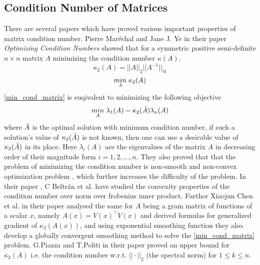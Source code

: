 \subsection{Condition Number of Matrices}
There are several papers which have proved various important properties of matrix condition number. Pierre Maréchal and Jane J. Ye in their paper \textit{Optimizing Condition Numbers}\cite{marechal2009optimizing} showed that for a symmetric positive semi-definite $n\times n$ matrix $A$ minimizing the condition number $\kappa (A)$.
\begin{equation} \label{cond_matrix}
    \kappa_2 (A) = ||A||_2||A^{-1}||_@
\end{equation}
\begin{equation} \label{min_cond_matrix}
    \underset{A}{min}\hspace{1mm} \kappa_2 (A)
\end{equation}
\ref{min_cond_matrix} is euqivalent to minimizing the following objective
\begin{equation}
    \underset{A}{min}\hspace{1mm} \lambda_1(A) - \kappa_2 (\Bar{A}) \lambda_n(A)
\end{equation}
where $\Bar{A}$ is the optimal solution with minimum condition number, if such a solution's value of $\kappa_2 (\Bar{A})$ is not known, then one can use a desirable value of $\kappa_2 (\Bar{A})$ in its place. Here $\lambda_i(A)$ are the eigenvalues of the matrix $A$ in decreasing order of their magnitude form $i=1,2,...,n$. They also proved that that the problem of minimizing the condition number is non-smooth and non-convex optimization problem \cite{marechal2009optimizing}, which further increases the difficulty of the problem. In their paper \cite{beltran2010convexity}, C Beltrán et al. have studied the convexity properties of the condition number over norm over frobenius inner product. Further Xiaojun Chen et al. in their paper \cite{chen2011minimizing} analysed the same for $A$ being a gram matrix of functions of a scalar $x$, namely $A(x) = V(x)^{\top}V(x)$ and derived formulas for generalized gradient of $\kappa_2(A(x))$, and using exponential smoothing function they also develop a globally convergent smoothing method to solve the \ref{min_cond_matrix} problem.
\newline \newline G.Piazza and T.Politi in their paper \cite{piazza2002upper} proved an upper bound for $\kappa_2 (A)$ i.e. the condition number w.r.t. $||\cdot||_2$ (the spectral norm) for $1\le k \le n$. 
